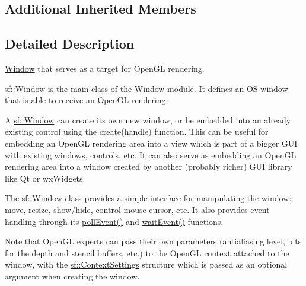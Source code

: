 \subsection*{Additional Inherited Members}


\subsection{Detailed Description}
\hyperlink{classsf_1_1_window}{Window} that serves as a target for Open\-G\-L rendering. 

\hyperlink{classsf_1_1_window}{sf\-::\-Window} is the main class of the \hyperlink{classsf_1_1_window}{Window} module. It defines an O\-S window that is able to receive an Open\-G\-L rendering.

A \hyperlink{classsf_1_1_window}{sf\-::\-Window} can create its own new window, or be embedded into an already existing control using the create(handle) function. This can be useful for embedding an Open\-G\-L rendering area into a view which is part of a bigger G\-U\-I with existing windows, controls, etc. It can also serve as embedding an Open\-G\-L rendering area into a window created by another (probably richer) G\-U\-I library like Qt or wx\-Widgets.

The \hyperlink{classsf_1_1_window}{sf\-::\-Window} class provides a simple interface for manipulating the window\-: move, resize, show/hide, control mouse cursor, etc. It also provides event handling through its \hyperlink{classsf_1_1_window_a338e996585faf82e93069858e3b531b7}{poll\-Event()} and \hyperlink{classsf_1_1_window_aaf02ab64fbc1d374eef3696df54137bc}{wait\-Event()} functions.

Note that Open\-G\-L experts can pass their own parameters (antialiasing level, bits for the depth and stencil buffers, etc.) to the Open\-G\-L context attached to the window, with the \hyperlink{structsf_1_1_context_settings}{sf\-::\-Context\-Settings} structure which is passed as an optional argument when creating the window.

